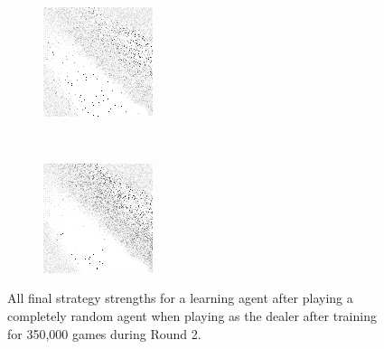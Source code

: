 \begin{figure}
\begin{subfigure}[t]{0.22\textwidth}
		\caption{\peggingmaxavggained}
	\end{subfigure}
	~
	\begin{subfigure}[t]{0.22\textwidth}
		\includegraphics[width=\textwidth]{images/findings/round2/strats/random/pegging_max_med_gained.png}
		\caption{\peggingmaxmedgained}
	\end{subfigure}
	~
	\begin{subfigure}[t]{0.22\textwidth}
		\includegraphics[width=\textwidth]{images/findings/round2/strats/random/pegging_min_avg_given.png}
		\caption{\peggingminavggiven}
	\end{subfigure}

\caption{
	All final strategy strengths for a learning agent
	after playing a completely random agent
	when playing as the dealer
	after training for 350,000 games during Round 2.
}
\label{fig:r2-strats-random}
\end{figure}
